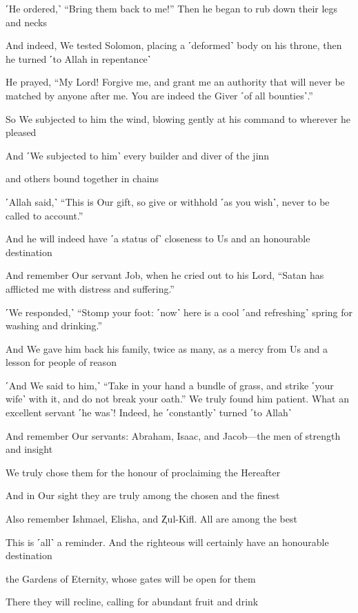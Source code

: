 ˹He ordered,˺ “Bring them back to me!” Then he began to rub down their legs and necks

And indeed, We tested Solomon, placing a ˹deformed˺ body on his throne, then he turned ˹to Allah in repentance˺

He prayed, “My Lord! Forgive me, and grant me an authority that will never be matched by anyone after me. You are indeed the Giver ˹of all bounties˺.”

So We subjected to him the wind, blowing gently at his command to wherever he pleased

And ˹We subjected to him˺ every builder and diver of the jinn

and others bound together in chains

˹Allah said,˺ “This is Our gift, so give or withhold ˹as you wish˺, never to be called to account.”

And he will indeed have ˹a status of˺ closeness to Us and an honourable destination

And remember Our servant Job, when he cried out to his Lord, “Satan has afflicted me with distress and suffering.”

˹We responded,˺ “Stomp your foot: ˹now˺ here is a cool ˹and refreshing˺ spring for washing and drinking.”

And We gave him back his family, twice as many, as a mercy from Us and a lesson for people of reason

˹And We said to him,˺ “Take in your hand a bundle of grass, and strike ˹your wife˺ with it, and do not break your oath.” We truly found him patient. What an excellent servant ˹he was˺! Indeed, he ˹constantly˺ turned ˹to Allah˺

And remember Our servants: Abraham, Isaac, and Jacob—the men of strength and insight

We truly chose them for the honour of proclaiming the Hereafter

And in Our sight they are truly among the chosen and the finest

Also remember Ishmael, Elisha, and Ⱬul-Kifl. All are among the best

This is ˹all˺ a reminder. And the righteous will certainly have an honourable destination

the Gardens of Eternity, whose gates will be open for them

There they will recline, calling for abundant fruit and drink

